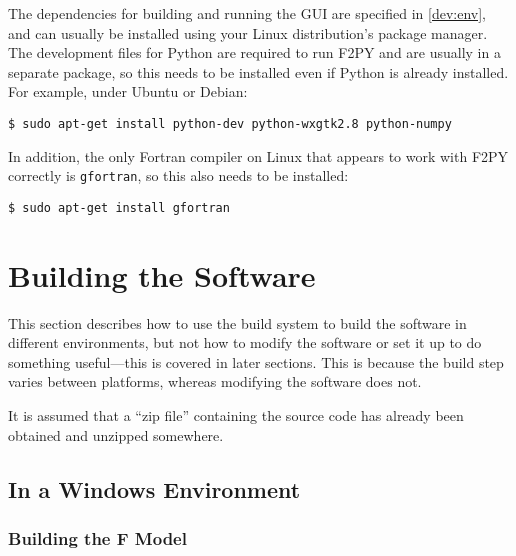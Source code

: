 \documentclass[10pt,a4paper]{article}
\begin{document}
The dependencies for building and running the GUI are specified in \ref{dev:env}, and can usually be 
installed using your Linux distribution's package manager.  The development files for Python are 
required to run F2PY and are usually in a separate package, so this needs to be installed even if 
Python is already installed.  For example, under Ubuntu or Debian:

\begin{lstlisting}
$ sudo apt-get install python-dev python-wxgtk2.8 python-numpy
\end{lstlisting}

In addition, the only Fortran compiler on Linux that appears to work with F2PY correctly is 
\verb|gfortran|, so this also needs to be installed:

\begin{lstlisting}
$ sudo apt-get install gfortran
\end{lstlisting}



\section{Building the Software}
\label{dev:build}

This section describes how to use the build system to build the software in different environments, 
but not how to modify the software or set it up to do something useful---this is covered in later 
sections.  This is because the build step varies between platforms, whereas modifying the software 
does not.

It is assumed that a ``zip file'' containing the source code has already been obtained and unzipped 
somewhere.

\subsection{In a Windows Environment}

\subsubsection{Building the F Model}
\end{document}
